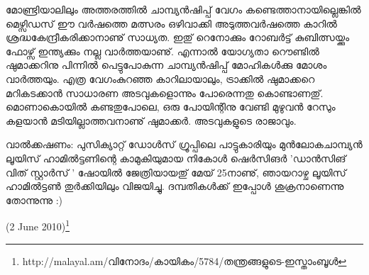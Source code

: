 മോണ്ട്രിയാലിലും അത്തരത്തില്‍ ചാമ്പ്യന്‍ഷിപ്പ് വേഗം കണ്ടെത്താനായില്ലെങ്കില്‍ മെഴ്സിഡസ് ഈ വര്‍ഷത്തെ മത്സരം 
ഒഴിവാക്കി അടുത്തവര്‍ഷത്തെ കാറില്‍ ശ്രദ്ധകേന്ദ്രീകരിക്കാനാണു് സാധ്യത. ഇതു് റെനോക്കും റോബര്‍ട്ട് കുബിത്സയ്ക്കും 
ഫോഴ്സ് ഇന്ത്യക്കും നല്ല വാര്‍ത്തയാണു്. എന്നാല്‍ യോഗ്യതാ റൌണ്ടില്‍ ഷുമാക്കറിനു പിന്നില്‍ പെട്ടുപോകുന്ന 
ചാമ്പ്യന്‍ഷിപ്പ് മോഹികള്‍ക്കു മോശം വാര്‍ത്തയും. എത്ര വേഗംകുറഞ്ഞ കാറിലായാലും, ട്രാക്കില്‍ ഷുമാക്കറെ മറികടക്കാന്‍
സാധാരണ അടവുകളൊന്നും പോരെന്നതു കൊണ്ടാണതു്. മൊണാകൊയില്‍ കണ്ടതുപോലെ, ഒരു പോയിന്റിനു വേണ്ടി 
മുഴുവന്‍ റേസും കളയാന്‍ മടിയില്ലാത്തവനാണു് ഷുമാക്കര്‍. അടവുകളുടെ രാജാവും.

വാല്‍ക്കഷണം: പുസിക്യാറ്റ് ഡോള്‍സ് ഗ്രൂപ്പിലെ പാട്ടുകാരിയും മുന്‍ലോകചാമ്പ്യന്‍ ലൂയിസ് ഹാമില്‍ട്ടണിന്റെ 
കാമുകിയുമായ നികോള്‍ ഷെര്‍സിങര്‍ 'ഡാന്‍സിങ് വിത് സ്റ്റാര്‍സ് ' ഷോയില്‍ ജേത്രിയായതു് മേയ് 25നാണു്, 
ഞായറാഴ്ച ലൂയിസ് ഹാമില്‍ട്ടണ്‍ തുര്‍ക്കിയിലും വിജയിച്ചു. ദമ്പതികള്‍ക്ക് ഇപ്പോള്‍ ശുക്രനാണെന്നു തോന്നുന്നു :)

(2 June 2010)\footnote{http://malayal.am/വിനോദം/കായികം/5784/തന്ത്രങ്ങളുടെ-ഇസ്താംബൂള്‍}

\newpage
